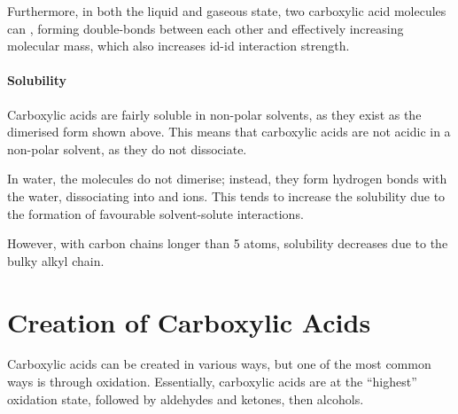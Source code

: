 		\pagebreak
		Furthermore, in both the liquid and gaseous state, two carboxylic acid molecules can , forming double-bonds between
		each other and effectively increasing molecular mass, which also increases id-id interaction strength.




		\paragraph{Solubility}

		Carboxylic acids are fairly soluble in non-polar solvents, as they exist as the dimerised form shown above. This means that carboxylic acids
		are not acidic in a non-polar solvent, as they do not dissociate.

		In water, the molecules do not dimerise; instead, they form hydrogen bonds with the water, dissociating into  and  ions.
		This tends to increase the solubility due to the formation of favourable solvent-solute interactions.

		However, with carbon chains longer than 5 atoms, solubility decreases due to the bulky alkyl chain.



	\pagebreak
	\section{Creation of Carboxylic Acids}

		Carboxylic acids can be created in various ways, but one of the most common ways is through oxidation. Essentially, carboxylic acids
		are at the \enquote{highest} oxidation state, followed by aldehydes and ketones, then alcohols.


